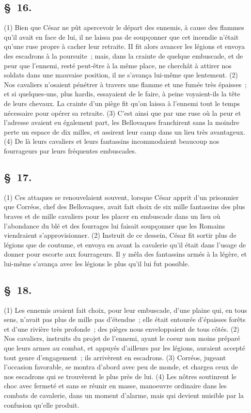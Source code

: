 \documentclass[french,twoside]{book} %
\begin{document}
\subsection[{§ 16.}]{ \textsc{§ 16.} }
\noindent (1) Bien que César ne pût apercevoir le départ des ennemis, à cause des flammes qu’il avait en face de lui, il ne laissa pas de soupçonner que cet incendie n’était qu’une ruse propre à cacher leur retraite. II fit alors avancer les légions et envoya des escadrons à la poursuite ; mais, dans la crainte de quelque embuscade, et de peur que l’ennemi, resté peut-être à la même place, ne cherchât à attirer nos soldats dans une mauvaise position, il ne s’avança lui-même que lentement. (2) Nos cavaliers n’osaient pénétrer à travers une flamme et une fumée très épaisses ; et si quelques-uns, plus hardis, essayaient de le faire, à peine voyaient-ils la tête de leurs chevaux. La crainte d’un piège fit qu’on laissa à l’ennemi tout le temps nécessaire pour opérer sa retraite. (3) C'est ainsi que par une ruse où la peur et l’adresse avaient eu également part, les Bellovaques franchirent sans la moindre perte un espace de dix milles, et assirent leur camp dans un lieu très avantageux. (4) De là leurs cavaliers et leurs fantassins incommodaient beaucoup nos fourrageurs par leurs fréquentes embuscades.
\subsection[{§ 17.}]{ \textsc{§ 17.} }
\noindent (1) Ces attaques se renouvelaient souvent, lorsque César apprit d’un prisonnier que Corréos, chef des Bellovaques, avait fait choix de six mille fantassins des plus braves et de mille cavaliers pour les placer en embuscade dans un lieu où l’abondance du blé et des fourrages lui faisait soupçonner que les Romains viendraient s’approvisionner. (2) Instruit de ce dessein, César fit sortir plus de légions que de coutume, et envoya en avant la cavalerie qu’il était dans l’usage de donner pour escorte aux fourrageurs. Il y mêla des fantassins armés à la légère, et lui-même s’avança avec les légions le plus qu’il lui fut possible.
\subsection[{§ 18.}]{ \textsc{§ 18.} }
\noindent (1) Les ennemis avaient fait choix, pour leur embuscade, d’une plaine qui, en tous sens, n’avait pas plus de mille pas d’étendue ; elle était entourée d’épaisses forêts et d’une rivière très profonde ; des pièges nous enveloppaient de tous côtés. (2) Nos cavaliers, instruits du projet de l’ennemi, ayant le coeur non moins préparé que leurs armes au combat, et appuyés d’ailleurs par les légions, auraient accepté tout genre d’engagement ; ils arrivèrent en escadrons. (3) Corréos, jugeant l’occasion favorable, se montra d’abord avec peu de monde, et chargea ceux de nos escadrons qui se trouvèrent le plus près de lui. (4) Les nôtres soutinrent le choc avec fermeté et sans se réunir en masse, manoeuvre ordinaire dans les combats de cavalerie, dans un moment d’alarme, mais qui devient nuisible par la confusion qu’elle produit.
\end{document}
